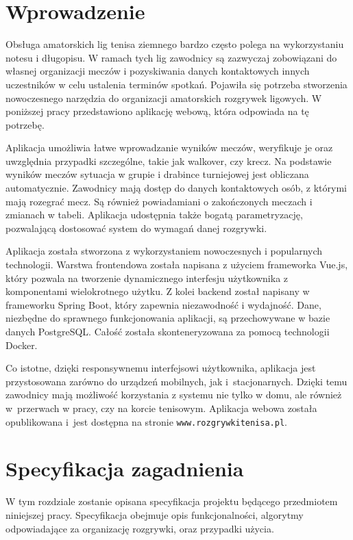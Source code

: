\documentclass[shortabstract]{iithesis}
\author         {Marcin Wróbel}
\begin{document}

\chapter{Wprowadzenie}
Obsługa amatorskich lig tenisa ziemnego bardzo często polega na wykorzystaniu notesu i długopisu.
W ramach tych lig zawodnicy są zazwyczaj zobowiązani do własnej organizacji meczów i pozyskiwania danych kontaktowych innych uczestników w celu ustalenia terminów spotkań.
Pojawiła się potrzeba stworzenia nowoczesnego narzędzia do organizacji amatorskich rozgrywek ligowych.
W poniższej pracy przedstawiono aplikację webową, która odpowiada na tę potrzebę.
\par
Aplikacja umożliwia łatwe wprowadzanie wyników meczów, weryfikuje je oraz uwzględnia przypadki szczególne, takie jak walkover, czy krecz.
Na podstawie wyników meczów sytuacja w grupie i drabince turniejowej jest obliczana automatycznie.
Zawodnicy mają dostęp do danych kontaktowych osób, z którymi mają rozegrać mecz. Są również powiadamiani o zakończonych meczach i zmianach w tabeli.
Aplikacja udostępnia także bogatą parametryzację, pozwalającą dostosować system do wymagań danej rozgrywki.
\par
Aplikacja została stworzona z wykorzystaniem nowoczesnych i popularnych technologii.
Warstwa frontendowa została napisana z użyciem frameworka Vue.js, który pozwala na tworzenie dynamicznego interfesju użytkownika z komponentami wielokrotnego użytku.
Z kolei backend został napisany w frameworku Spring Boot, który zapewnia niezawodność i wydajność.
Dane, niezbędne do sprawnego funkcjonowania aplikacji, są przechowywane w bazie danych PostgreSQL.
Całość została skonteneryzowana za pomocą technologii Docker.
\par
Co istotne, dzięki responsywnemu interfejsowi użytkownika, aplikacja jest przystosowana zarówno do urządzeń mobilnych, jak i~stacjonarnych.
Dzięki temu zawodnicy mają możliwość korzystania z systemu nie tylko w domu, ale również w~przerwach w pracy, czy na korcie tenisowym.
Aplikacja webowa została opublikowana i~jest dostępna na stronie \texttt{www.rozgrywkitenisa.pl}.
\par

\chapter{Specyfikacja zagadnienia}
W tym rozdziale zostanie opisana specyfikacja projektu będącego przedmiotem niniejszej pracy.
Specyfikacja obejmuje opis funkcjonalności, algorytmy odpowiadające za organizację rozgrywki, oraz przypadki użycia.
\end{document}
